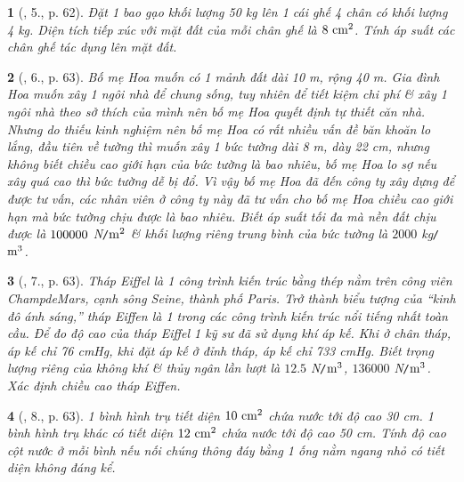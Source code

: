 \documentclass{article}
\newtheorem{baitoan}{}
\begin{document}
\begin{baitoan}[\cite{Van_Quyen_Hanh_Nhu_10_chuyen_Ly}, 5., p. 62]
	Đặt 1 bao gạo khối lượng {\rm50 kg} lên 1 cái ghế 4 chân có khối lượng {\rm4 kg}. Diện tích tiếp xúc với mặt đất của mỗi chân ghế là $\rm8\ cm^2$. Tính áp suất các chân ghế tác dụng lên mặt đất.
\end{baitoan}

\begin{baitoan}[\cite{Van_Quyen_Hanh_Nhu_10_chuyen_Ly}, 6., p. 63]
	Bố mẹ Hoa muốn có 1 mảnh đất dài {\rm10 m}, rộng {\rm40 m}. Gia đình Hoa muốn xây 1 ngôi nhà để chung sống, tuy nhiên để tiết kiệm chi phí \& xây 1 ngôi nhà theo sở thích của mình nên bố mẹ Hoa quyết định tự thiết căn nhà. Nhưng do thiếu kinh nghiệm nên bố mẹ Hoa có rất nhiều vấn đề băn khoăn lo lắng, đầu tiên về tường thì muốn xây 1 bức tường dài {\rm 8 m}, dày {\rm22 cm}, nhưng không biết chiều cao giới hạn của bức tường là bao nhiêu, bố mẹ Hoa lo sợ nếu xây quá cao thì bức tường dễ bị đổ. Vì vậy bố mẹ Hoa đã đến công ty xây dựng để được tư vấn, các nhân viên ở công ty này đã tư vấn cho bố mẹ Hoa chiều cao giới hạn mà bức tường chịu được là bao nhiêu. Biết áp suất tối đa mà nền đất chịu được là $\rm100000$ {\rm N{\tt/}$\rm m^2$} \& khối lượng riêng trung bình của bức tường là $2000$ {\rm kg{\tt/}$\rm m^3$}.
\end{baitoan}

\begin{baitoan}[\cite{Van_Quyen_Hanh_Nhu_10_chuyen_Ly}, 7., p. 63]
	Tháp Eiffel là 1 công trình kiến trúc bằng thép nằm trên công viên ChampdeMars, cạnh sông Seine, thành phố Paris. Trở thành biểu tượng của ``kinh đô ánh sáng,'' tháp Eiffen là 1 trong các công trình kiến trúc nổi tiếng nhất toàn cầu. Để đo độ cao của tháp Eiffel 1 kỹ sư đã sử dụng khí áp kế. Khi ở chân tháp, áp kế chỉ {\rm76 cmHg}, khi đặt áp kế ở đỉnh tháp, áp kế chỉ {\rm733 cmHg}. Biết trọng lượng riêng của không khí \& thủy ngân lần lượt là $12.5$ {\rm N{\tt/}$\rm m^3$}, $136000$ {\rm N{\tt/}$\rm m^3$}. Xác định chiều cao tháp Eiffen.
\end{baitoan}

\begin{baitoan}[\cite{Van_Quyen_Hanh_Nhu_10_chuyen_Ly}, 8., p. 63]
	1 bình hình trụ tiết diện $\rm10\ cm^2$ chứa nước tới độ cao {\rm30 cm}. 1 bình hình trụ khác có tiết diện $\rm12\ cm^2$ chứa nước tới độ cao {\rm50 cm}. Tính độ cao cột nước ở mỗi bình nếu nối chúng thông đáy bằng 1 ống nằm ngang nhỏ có tiết diện không đáng kể.
\end{baitoan}
\end{document}
